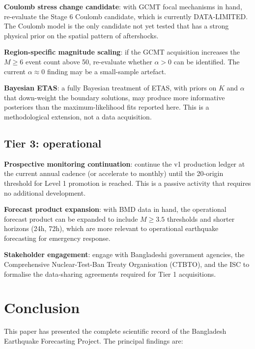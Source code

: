 \documentclass[10pt,a4paper,twocolumn]{article}
\begin{document}
\textbf{Coulomb stress change candidate}: with GCMT focal mechanisms in hand, re-evaluate the Stage 6 Coulomb candidate, which is currently DATA-LIMITED. The Coulomb model is the only candidate not yet tested that has a strong physical prior on the spatial pattern of aftershocks.

\textbf{Region-specific magnitude scaling}: if the GCMT acquisition increases the $M\geq6$ event count above 50, re-evaluate whether $\alpha>0$ can be identified. The current $\alpha\approx0$ finding may be a small-sample artefact.

\textbf{Bayesian ETAS}: a fully Bayesian treatment of ETAS, with priors on $K$ and $\alpha$ that down-weight the boundary solutions, may produce more informative posteriors than the maximum-likelihood fits reported here. This is a methodological extension, not a data acquisition.

\subsection{Tier 3: operational}

\textbf{Prospective monitoring continuation}: continue the v1 production ledger at the current annual cadence (or accelerate to monthly) until the 20-origin threshold for Level 1 promotion is reached. This is a passive activity that requires no additional development.

\textbf{Forecast product expansion}: with BMD data in hand, the operational forecast product can be expanded to include $M\geq3.5$ thresholds and shorter horizons (24h, 72h), which are more relevant to operational earthquake forecasting for emergency response.

\textbf{Stakeholder engagement}: engage with Bangladeshi government agencies, the Comprehensive Nuclear-Test-Ban Treaty Organisation (CTBTO), and the ISC to formalise the data-sharing agreements required for Tier 1 acquisitions.

\section{Conclusion}\label{sec:conclusion}

This paper has presented the complete scientific record of the Bangladesh Earthquake Forecasting Project. The principal findings are:
\end{document}
